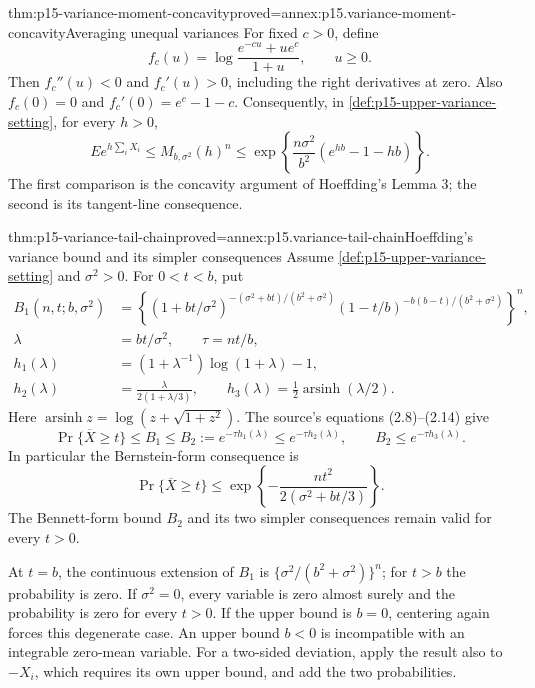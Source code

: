 \begin{hblemma}{thm:p15-variance-moment-concavity}{proved=annex:p15.variance-moment-concavity}{Averaging unequal variances}
For fixed \(c>0\), define
\[
 f_c(u)=\log\frac{e^{-cu}+ue^c}{1+u},\qquad u\geq0.
\]
Then \(f_c''(u)<0\) and \(f_c'(u)>0\), including the right derivatives
at zero. Also \(f_c(0)=0\) and \(f_c'(0)=e^c-1-c\).
Consequently, in \cref{def:p15-upper-variance-setting}, for every \(h>0\),
\[
 E e^{h\sum_iX_i}
 \leq M_{b,\sigma^2}(h)^n
 \leq \exp\!\left\{\frac{n\sigma^2}{b^2}(e^{hb}-1-hb)\right\}.
\]
The first comparison is the concavity argument of Hoeffding's Lemma 3;
the second is its tangent-line consequence.
\end{hblemma}

\begin{hbtheorem}{thm:p15-variance-tail-chain}{proved=annex:p15.variance-tail-chain}{Hoeffding's variance bound and its simpler consequences}
Assume \cref{def:p15-upper-variance-setting} and \(\sigma^2>0\).
For \(0<t<b\), put
\[
\begin{split}
 B_1(n,t;b,\sigma^2)
 &=
 \left\{
 (1+bt/\sigma^2)^{-(\sigma^2+bt)/(b^2+\sigma^2)}
 (1-t/b)^{-b(b-t)/(b^2+\sigma^2)}
 \right\}^{n},\\
 \lambda&=bt/\sigma^2,\qquad \tau=nt/b,\\
 h_1(\lambda)&=(1+\lambda^{-1})\log(1+\lambda)-1,\\
 h_2(\lambda)&=\frac{\lambda}{2(1+\lambda/3)},\qquad
 h_3(\lambda)=\frac12\operatorname{arsinh}(\lambda/2).
\end{split}
\]
Here \(\operatorname{arsinh}z=\log(z+\sqrt{1+z^2})\).
The source's equations (2.8)--(2.14) give
\[
 \Pr\{\overline X\geq t\}\leq B_1
 \leq B_2:=e^{-\tau h_1(\lambda)}
 \leq e^{-\tau h_2(\lambda)},\qquad
 B_2\leq e^{-\tau h_3(\lambda)}.
\]
In particular the Bernstein-form consequence is
\[
 \Pr\{\overline X\geq t\}
 \leq \exp\!\left\{-\frac{nt^2}{2(\sigma^2+bt/3)}\right\}.
\]
The Bennett-form bound \(B_2\) and its two simpler consequences remain
valid for every \(t>0\).

At \(t=b\), the continuous extension of \(B_1\) is
\(\{\sigma^2/(b^2+\sigma^2)\}^n\); for \(t>b\) the probability is zero.
If \(\sigma^2=0\), every variable is zero almost surely and the probability
is zero for every \(t>0\). If the upper bound is \(b=0\), centering again
forces this degenerate case. An upper bound \(b<0\) is incompatible with
an integrable zero-mean variable.
For a two-sided deviation, apply the result also to \(-X_i\), which
requires its own upper bound, and add the two probabilities.
\end{hbtheorem}

